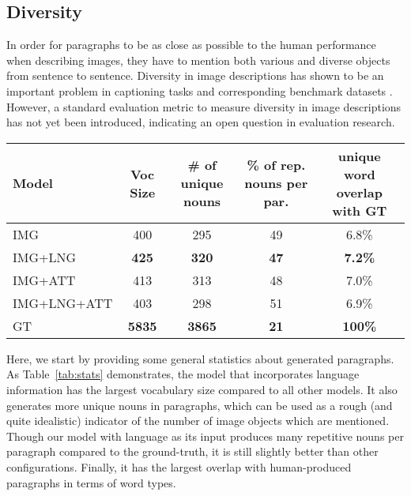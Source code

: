 \documentclass[11pt,a4paper]{article}
\begin{document}
\subsection{Diversity}
In order for paragraphs to be as close as possible to the human performance when describing images, they have to mention both various and diverse objects from sentence to sentence.
Diversity in image descriptions has shown to be an important problem in captioning tasks and corresponding benchmark datasets \cite{devlin2015language,lindh_generating_2018}.
However, a standard evaluation metric to measure diversity in image descriptions has not yet been introduced, indicating an open question in evaluation research.

\begin{table*}[]
    \footnotesize
    \centering
    \begin{tabular}{|l|c|c|c|c|}
    \hline
       \textbf{Model}  &  \textbf{Voc Size} & \textbf{\# of unique nouns} & \textbf{\% of rep. nouns per par.} & \textbf{unique word overlap with GT} \\
    \hline
      IMG   & 400 & 295 & 49 & 6.8\% \\
    \hline
      IMG+LNG   & \textbf{425} & \textbf{320} & \textbf{47} & \textbf{7.2\%} \\
    \hline
      IMG+ATT   & 413 & 313 & 48 & 7.0\% \\
    \hline
      IMG+LNG+ATT   & 403 & 298 & 51 & 6.9\% \\
    \hline
    \hline
      GT & \textbf{5835} & \textbf{3865} & \textbf{21} & \textbf{100\%} \\
    \hline
    \end{tabular}
    \caption{General statistics for generated image paragraphs.}
    \label{tab:stats}
\end{table*}

Here, we start by providing some general statistics about generated paragraphs.
As Table~\ref{tab:stats} demonstrates, the model that incorporates language information has the largest vocabulary size compared to all other models.
It also generates more unique nouns in paragraphs, which can be used as a rough (and quite idealistic) indicator of the number of image objects which are mentioned.
Though our model with language as its input produces many repetitive nouns per paragraph compared to the ground-truth, it is still slightly better than other configurations.
Finally, it has the largest overlap with human-produced paragraphs in terms of word types.
\end{document}
